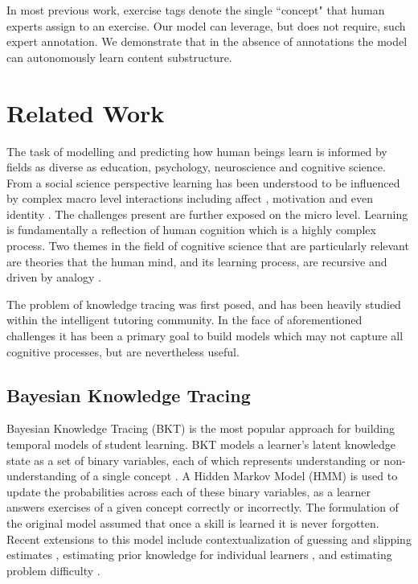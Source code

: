 \documentclass{article} \usepackage{nips,times}
\begin{document}
In most previous work, exercise tags denote the single ``concept" that human experts assign to an exercise.
Our model can leverage, but does not require, such expert annotation. We demonstrate that in the absence of annotations the model can autonomously learn content substructure.





\section{Related Work}

The task of modelling and predicting how human beings learn is informed by fields as diverse as education, psychology, neuroscience and cognitive science. From a social science perspective learning has been understood to be influenced by complex macro level interactions including affect \cite{linnenbrink2004role},
motivation \cite{elliot2013handbook}
and even identity \cite{cohen2008identity}. The challenges present are further exposed on the micro level. Learning is fundamentally a reflection of human cognition which is a highly complex process. Two themes in the field of cognitive science that are particularly relevant are theories that the human mind, and its learning process, are recursive \cite{fitch2005evolution} and driven by analogy \cite{gentner1983structure}.


The problem of knowledge tracing was first posed, and has been heavily studied within the intelligent tutoring community. In the face of aforementioned challenges it has been a primary goal to build models which may not capture all cognitive processes, but are nevertheless useful.





\subsection{Bayesian Knowledge Tracing}

Bayesian Knowledge Tracing (BKT) is the most popular approach for building temporal models of student learning. BKT models a learner's latent knowledge state as a set of binary variables, each of which represents understanding or non-understanding of a single concept \cite{corbett1994knowledge}. A Hidden Markov Model (HMM) is used to update the probabilities across each of these binary variables, as a learner answers exercises of a given concept correctly or incorrectly. The formulation of the original model assumed that once a skill is learned it is never forgotten.  Recent extensions to this model include contextualization of guessing and slipping estimates \cite{d2008more}, estimating prior knowledge for individual learners \cite{yudelson2013individualized}, and estimating problem difficulty \cite{pardos2011kt}.
\end{document}
